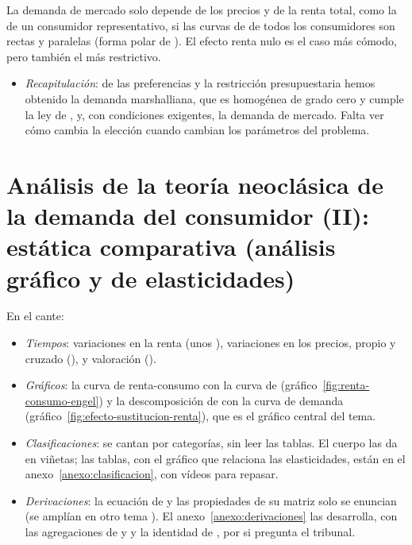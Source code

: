 \documentclass[11pt]{article}
\begin{document}
\begin{ideaclave}
La demanda de mercado solo depende de los precios y de la renta total, como la de un consumidor representativo, si las curvas de  de todos los consumidores son rectas y paralelas (forma polar de ). El efecto renta nulo es el caso más cómodo, pero también el más restrictivo.
\end{ideaclave}

\begin{itemize}
\item \emph{Recapitulación}: de las preferencias y la restricción presupuestaria hemos obtenido la demanda marshalliana, que es homogénea de grado cero y cumple la ley de , y, con condiciones exigentes, la demanda de mercado. Falta ver cómo cambia la elección cuando cambian los parámetros del problema.
\end{itemize}

\section{Análisis de la teoría neoclásica de la demanda\cortetitulo{} del consumidor (II): estática comparativa\cortetitulo{} (análisis gráfico y de elasticidades)}\label{sec:analisis-teoria-neoclasica-demanda}

\begin{notaopositor}
En el cante:
\begin{itemize}
\item \emph{Tiempos}: variaciones en la renta (unos ), variaciones en los precios, propio y cruzado (), y valoración ().
\item \emph{Gráficos}: la curva de renta-consumo con la curva de  (gráfico~\ref{fig:renta-consumo-engel}) y la descomposición de  con la curva de demanda (gráfico~\ref{fig:efecto-sustitucion-renta}), que es el gráfico central del tema.
\item \emph{Clasificaciones}: se cantan por categorías, sin leer las tablas. El cuerpo las da en viñetas; las tablas, con el gráfico que relaciona las elasticidades, están en el anexo~\ref{anexo:clasificacion}, con vídeos para repasar.
\item \emph{Derivaciones}: la ecuación de  y las propiedades de su matriz solo se enuncian (se amplían en otro tema ). El anexo~\ref{anexo:derivaciones} las desarrolla, con las agregaciones de  y  y la identidad de , por si pregunta el tribunal.
\end{itemize}
\end{notaopositor}
\end{document}

